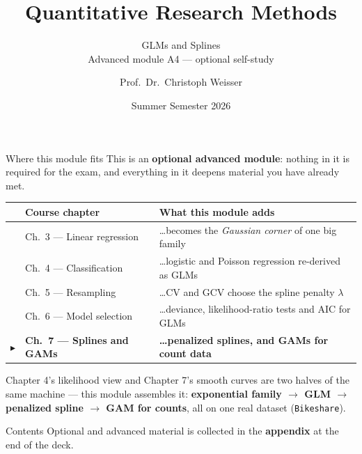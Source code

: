 \documentclass[aspectratio=169,11pt]{beamer}
\title{Quantitative Research Methods}
\subtitle{GLMs and Splines\\[2pt]{\small Advanced module A4 --- optional self-study}}
\author{Prof.\ Dr.\ Christoph Weisser}\institute{HSBI}
\date{Summer Semester 2026}\graphicspath{{images/}}
\begin{document}
\begin{frame}[plain]\titlepage\end{frame}

\begin{frame}{Where this module fits}
  \footnotesize
  This is an \textbf{optional advanced module}: nothing in it is required for the exam,
  and everything in it deepens material you have already met.
  \begin{center}
  \begin{tabular}{@{}c l l@{}}
    & \textbf{Course chapter} & \textbf{What this module adds} \\
    \midrule
    & Ch.\ 3 --- Linear regression & \ldots{}becomes the \emph{Gaussian corner} of one big family \\
    & Ch.\ 4 --- Classification & \ldots{}logistic and Poisson regression re-derived as GLMs \\
    & Ch.\ 5 --- Resampling & \ldots{}CV and GCV choose the spline penalty $\lambda$ \\
    & Ch.\ 6 --- Model selection & \ldots{}deviance, likelihood-ratio tests and AIC for GLMs \\
    $\blacktriangleright$ & \textbf{Ch.\ 7 --- Splines and GAMs} & \textbf{\ldots{}penalized splines, and GAMs for count data} \\
  \end{tabular}
  \end{center}
  \vspace{2pt}
  \begin{takeaway}
    Chapter 4's likelihood view and Chapter 7's smooth curves are two halves of the same
    machine --- this module assembles it: \textbf{exponential family $\to$ GLM $\to$
    penalized spline $\to$ GAM for counts}, all on one real dataset (\texttt{Bikeshare}).
  \end{takeaway}
\end{frame}

\begin{frame}{Contents}\small\tableofcontents[hideallsubsections]
  \vfill
  {\tiny Optional and advanced material is collected in the \textbf{appendix} at the end of the deck.}
\end{frame}
\end{document}
